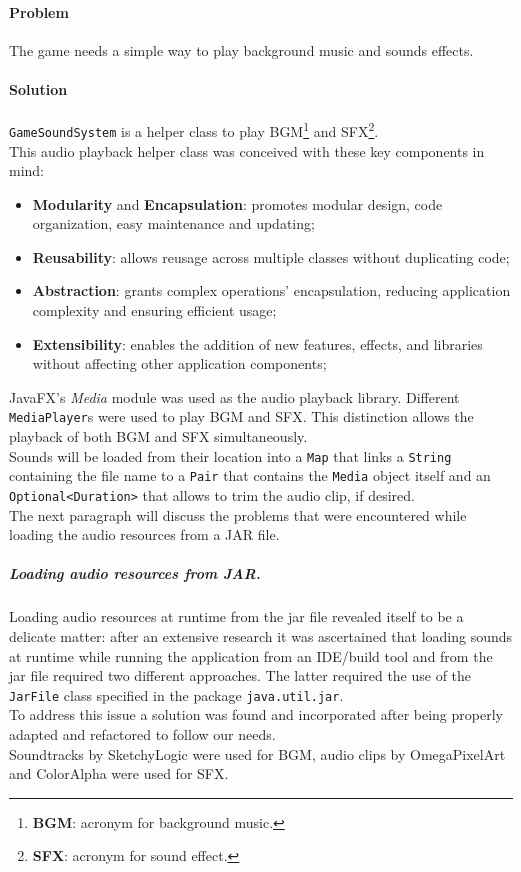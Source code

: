 \documentclass[12pt, a4paper]{report}
\theoremstyle{definition}
\begin{document}
    \paragraph{Problem}
    The game needs a simple way to play background music and sounds effects.
    \paragraph{Solution}
    \verb|GameSoundSystem| is a helper class to play BGM\footnote{\textbf{BGM}: acronym for background music.} and SFX\footnote{\textbf{SFX}: acronym for sound effect.}.\\
    This audio playback helper class was conceived with these key components in mind:

    \begin{itemize}
        \item \textbf{Modularity} and \textbf{Encapsulation}: promotes modular design, code organization, easy maintenance and updating;
        \item \textbf{Reusability}: allows reusage across multiple classes without duplicating code;
        \item \textbf{Abstraction}: grants complex operations' encapsulation, reducing application complexity and ensuring efficient usage;
        \item \textbf{Extensibility}: enables the addition of new features, effects, and libraries without affecting other application components;
    \end{itemize}

    JavaFX's \textit{Media} module was used as the audio playback library. Different \verb|MediaPlayer|s were used to play BGM and SFX.
    This distinction allows the playback of both BGM and SFX simultaneously.\\
    Sounds will be loaded from their location into a \verb|Map| that links a \verb|String| containing the file name to a \verb|Pair| that contains the
    \verb|Media| object itself and an \verb|Optional<Duration>| that allows to trim the audio clip, if desired.\\
    The next paragraph will discuss the problems that were encountered while loading the audio resources from a JAR file.

    \subparagraph{Loading audio resources from JAR.}
    Loading audio resources at runtime from the jar file revealed itself to be a delicate matter: after an extensive research it was ascertained that loading
    sounds at runtime while running the application from an IDE/build tool and from the jar file required two different approaches. The latter required the use
    of the \verb|JarFile| class specified in the package \verb|java.util.jar|.\\
    To address this issue a solution \cite{jarFile} was found and incorporated after being properly adapted and refactored to follow our needs.\\
    Soundtracks by SketchyLogic \cite{bgm} were used for BGM, audio clips by OmegaPixelArt \cite{sfxGB} and ColorAlpha \cite{sfxMenu} were used for SFX.
\end{document}

